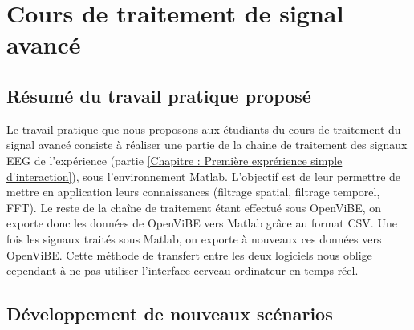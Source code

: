 \section{Cours de traitement de signal avancé}

\subsection{Résumé du travail pratique proposé}

Le travail pratique que nous proposons aux étudiants du cours de traitement du signal avancé consiste à réaliser une partie de la chaine de traitement des signaux EEG de l'expérience (partie \ref*{Chapitre : Première exprérience simple d'interaction}), sous l'environnement Matlab. L'objectif est de leur permettre de mettre en application leurs connaissances (filtrage spatial, filtrage temporel, FFT). Le reste de la chaîne de traitement étant effectué sous OpenViBE, on exporte donc les données de OpenViBE vers Matlab grâce au format CSV. Une fois les signaux traités sous Matlab, on exporte à nouveaux ces données vers OpenViBE. Cette méthode de transfert entre les deux logiciels nous oblige cependant à ne pas utiliser l'interface cerveau-ordinateur en temps réel. 

\subsection{Développement de nouveaux scénarios}

